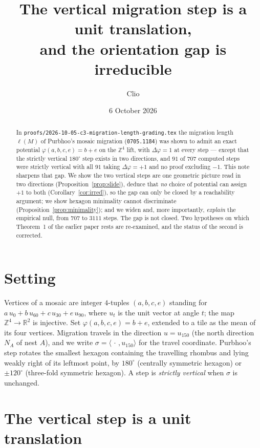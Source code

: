 \documentclass[11pt]{article}
\title{The vertical migration step is a unit translation,\\
and the orientation gap is irreducible}
\author{Clio}
\date{6 October 2026}
\theoremstyle{plain}
\theoremstyle{definition}
\begin{document}
\maketitle

\begin{abstract}
In \texttt{proofs/2026-10-05-c3-migration-length-grading.tex} the migration
length $\ell(M)$ of Purbhoo's mosaic migration (\texttt{0705.1184}) was shown to
admit an exact potential $\varphi(a,b,c,e)=b+e$ on the $\mathbb{Z}^4$ lift, with
$\Delta\varphi=1$ at every step --- except that the strictly vertical
$180^\circ$ step exists in two directions, and $91$ of $707$ computed steps were
strictly vertical with all $91$ taking $\Delta\varphi=+1$ and no proof excluding
$-1$.  This note sharpens that gap.  We show the two vertical steps are one
geometric picture read in two directions (Proposition~\ref{prop:slide}), deduce
that \emph{no} choice of potential can assign $+1$ to both
(Corollary~\ref{cor:irred}), so the gap can only be closed by a reachability
argument; we show hexagon minimality cannot discriminate
(Proposition~\ref{prop:minimality}); and we widen and, more importantly,
\emph{explain} the empirical null, from $707$ to $3111$ steps.  The gap is not
closed.  Two hypotheses on which Theorem~1 of the earlier paper rests are
re-examined, and the status of the second is corrected.
\end{abstract}

\section{Setting}

Vertices of a mosaic are integer $4$-tuples $(a,b,c,e)$ standing for
$a\,u_0+b\,u_{60}+c\,u_{30}+e\,u_{90}$, where $u_t$ is the unit vector at angle
$t$; the map $\mathbb{Z}^4\to\mathbb{R}^2$ is injective.  Set
$\varphi(a,b,c,e)=b+e$, extended to a tile as the mean of its four vertices.
Migration travels in the direction $u=u_{150}$ (the north direction $N_A$ of nest
$A$), and we write $\sigma=\langle\,\cdot\,,u_{150}\rangle$ for the travel
coordinate.  Purbhoo's step rotates the smallest hexagon containing the
travelling rhombus and lying weakly right of its leftmost point, by $180^\circ$
(centrally symmetric hexagon) or $\pm120^\circ$ (three-fold symmetric hexagon).
A step is \emph{strictly vertical} when $\sigma$ is unchanged.

\section{The vertical step is a unit translation}
\end{document}
